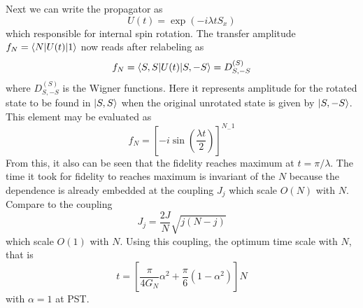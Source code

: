 \documentclass[../../../main.tex]{subfiles}
\begin{document}
Next we can write the propagator as
\begin{equation*}
  U(t) = \exp (-i \lambda t S_x)
\end{equation*}
which responsible for internal spin rotation.
The transfer amplitude $f_N = \braket{N |U(t)|1 }$ now reads after relabeling as
\begin{equation*}
  f_N = \braket{S,S |U(t) |S,-S} =D^{(S)}_{S,-S}
\end{equation*}
where $D^{(S)}_{S,-S} $ is the Wigner functions.
Here it represents amplitude for the rotated state to be found in $\ket{S,S}$ when the original unrotated state is given by $\ket{S,-S}$.
This element may be evaluated as
\begin{equation*}
  f_N= \left[-i\sin\left(\frac{\lambda t}{2}\right)\right]^{N_-1}
\end{equation*}
From this, it also can be seen that the fidelity reaches maximum at $t  = \pi/\lambda$.
The time it took for fidelity to reaches maximum is invariant of the $N$ because the dependence is already embedded at the coupling $J_j$ which scale $O(N)$ with $N$.
Compare to the coupling
\begin{equation*}
  J_j = \frac{2J }{N} \sqrt{j(N-j)}
\end{equation*}
which scale $O(1)$ with $N$.
Using this coupling, the optimum time scale with $N$, that is
\begin{equation*}
  t = \left[\frac{\pi}{4G_N}\alpha^2 + \frac{\pi}{6}(1-\alpha^2)\right]N
\end{equation*}
with $\alpha=1$ at PST.
\end{document}
